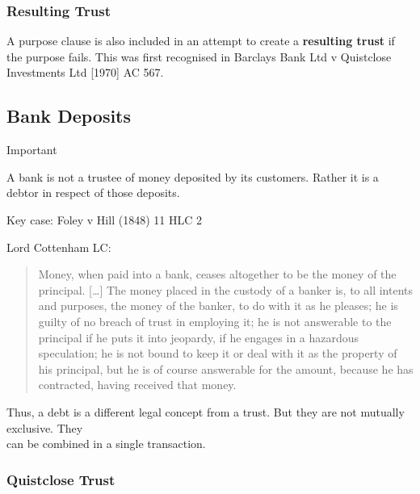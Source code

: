 \documentclass[
]{article}
\newenvironment{env-d797b130-4ec5-4d02-9c44-4f2a86698248}
{
    \savenotes\tcolorbox[blanker,breakable,left=5pt,borderline west={2pt}{-4pt}{cyan}]
}
{
    \endtcolorbox\spewnotes
}
\begin{document}
\hypertarget{resulting-trust}{%
\subsubsection{Resulting Trust}\label{resulting-trust}}

A purpose clause is also included in an attempt to create a
\textbf{resulting trust} if the purpose fails. This was first recognised
in Barclays Bank Ltd v Quistclose Investments Ltd {[}1970{]} AC 567.

\hypertarget{bank-deposits}{%
\subsection{Bank Deposits}\label{bank-deposits}}

\begin{env-d797b130-4ec5-4d02-9c44-4f2a86698248}

Important

A bank is not a trustee of money deposited by its customers. Rather it
is a debtor in respect of those deposits.

\end{env-d797b130-4ec5-4d02-9c44-4f2a86698248}

Key case: Foley v Hill (1848) 11 HLC 2

Lord Cottenham LC:

\begin{quote}
Money, when paid into a bank, ceases altogether to be the money of the
principal. {[}\ldots{]} The money placed in the custody of a banker is,
to all intents and purposes, the money of the banker, to do with it as
he pleases; he is guilty of no breach of trust in employing it; he is
not answerable to the principal if he puts it into jeopardy, if he
engages in a hazardous speculation; he is not bound to keep it or deal
with it as the property of his principal, but he is of course answerable
for the amount, because he has contracted, having received that money.
\end{quote}

Thus, a debt is a different legal concept from a trust. But they are not
mutually exclusive. They\\
can be combined in a single transaction.

\hypertarget{quistclose-trust}{%
\subsubsection{Quistclose Trust}\label{quistclose-trust}}
\end{document}
